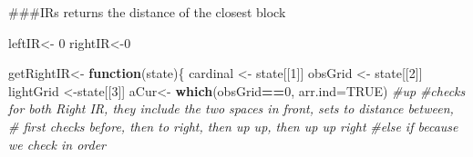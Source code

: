 \documentclass[]{article}
\newenvironment{Shaded}{\begin{snugshade}}{\end{snugshade}}
\newcommand{\CommentTok}[1]{\textcolor[rgb]{0.56,0.35,0.01}{\textit{#1}}}
\newcommand{\ControlFlowTok}[1]{\textcolor[rgb]{0.13,0.29,0.53}{\textbf{#1}}}
\newcommand{\DataTypeTok}[1]{\textcolor[rgb]{0.13,0.29,0.53}{#1}}
\newcommand{\DecValTok}[1]{\textcolor[rgb]{0.00,0.00,0.81}{#1}}
\newcommand{\KeywordTok}[1]{\textcolor[rgb]{0.13,0.29,0.53}{\textbf{#1}}}
\newcommand{\NormalTok}[1]{#1}
\newcommand{\OperatorTok}[1]{\textcolor[rgb]{0.81,0.36,0.00}{\textbf{#1}}}
\newcommand{\OtherTok}[1]{\textcolor[rgb]{0.56,0.35,0.01}{#1}}
\newcommand{\StringTok}[1]{\textcolor[rgb]{0.31,0.60,0.02}{#1}}
\begin{document}
\#\#\#IRs returns the distance of the closest block

\begin{Shaded}
\begin{Highlighting}[]
\NormalTok{leftIR<-}\StringTok{ }\DecValTok{0}
\NormalTok{rightIR<-}\DecValTok{0}

\NormalTok{getRightIR<-}\StringTok{ }\ControlFlowTok{function}\NormalTok{(state)\{}
\NormalTok{    cardinal <-}\StringTok{ }\NormalTok{state[[}\DecValTok{1}\NormalTok{]]}
\NormalTok{  obsGrid <-}\StringTok{ }\NormalTok{state[[}\DecValTok{2}\NormalTok{]]}
\NormalTok{  lightGrid <-state[[}\DecValTok{3}\NormalTok{]]}
\NormalTok{  aCur<-}\StringTok{ }\KeywordTok{which}\NormalTok{(obsGrid}\OperatorTok{==}\DecValTok{0}\NormalTok{, }\DataTypeTok{arr.ind=}\OtherTok{TRUE}\NormalTok{)}
  \CommentTok{#up}
  \CommentTok{#checks for both Right  IR, they include the two spaces in front, sets to distance between,}
  \CommentTok{# first checks before, then to right, then up up, then up up right}
  \CommentTok{#else if because we check in order}
  

\end{Highlighting}
\end{Shaded}
\end{document}
